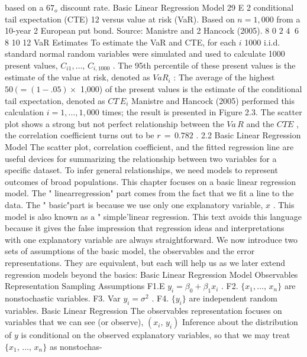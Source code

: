 \documentclass[11pt]{article}
\begin{document}
 based on a \(6 7_{o}\) discount rate.
 Basic Linear Regression Model 29
E
2 conditional tail
expectation (CTE)
12 versus value at risk
(VaR). Based on
\(n=1 , 0 0 0\)
 from a 10-year
2 European put bond.
Source: Manistre and
2 Hancock (2005).
8
0 \(2\) \(4 ~\) 6 8 10 12
VaR Estimates
To estimate the VaR and CTE, for each \(i\) 1000 i.i.d. standard normal
random variables were simulated and used to calculate 1000 present values,
\(C_{i 1} , \ldots, \, C_{i , 1 0 0 0}\) . The 95th percentile of these present values is the estimate of
the value at risk, denoted as \(V a R_{i}\) : The average of the highest \(5 0 ~ (=( 1-. 0 5 ) \times\)
1,000) of the present values is the estimate of the conditional tail expectation,
denoted as \(C T \, E_{i}\) Manistre and Hancock (2005) performed this calculation
\(i=1 , \dots, 1 , 0 0 0\) times; the result is presented in Figure 2.3. The scatter plot
 shows a strong but not perfect relationship between the \(V a \, R\) and the \(C T E\) , the
 correlation coefficient turns out to be \(r \,=\, 0 . 7 8 2\) .
 2.2 Basic Linear Regression Model
The scatter plot, correlation coefficient, and the fitted regression line are useful
 devices for summarizing the relationship between two variables for a specific
 dataset. To infer general relationships, we need models to represent outcomes of
 broad populations.
 This chapter focuses on a basic linear regression model. The " linearregression"
 part comes from the fact that we fit a line to the data. The " basic"part is because we
 use only one explanatory variable, \(x\) . This model is also known as \(\mathrm{a}\) " simple'linear
regression. This text avoids this language because it gives the false impression
 that regression ideas and interpretations with one explanatory variable are always
 straightforward.
We now introduce two sets of assumptions of the basic model, the observables
and the error representations. They are equivalent, but each will help us as we
later extend regression models beyond the basics:
 Basic Linear Regression Model
Observables Representation Sampling Assumptions
F1.E \(y_{i}=\beta_{0}+\beta_{1} x_{i}\) .
F2. \(\{x_{1} , \dots, \, x_{n} \}\) are nonstochastic variables.
F3. Var \(y_{i}=\sigma^{2}\) .
F4. \(\{y_{i} \}\) are independent random variables.
 Basic Linear Regression
The observables representation focuses on variables that we can see (or
observe), \(( x_{i} , \, y_{i} )\) Inference about the distribution of \(y\) is conditional on the
observed explanatory variables, so that we may treat \(\{x_{1} , \, \dots, \, x_{n} \}\) as nonstochas-
\end{document}
